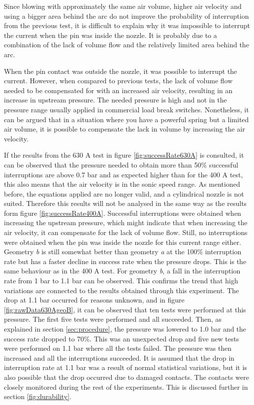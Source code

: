 \documentclass[10pt,a4paper,twoside]{article}
\begin{document}
Since blowing with approximately the same air volume, higher air velocity and using a bigger area behind the arc do not improve the probability of interruption from the previous test, it is difficult to explain why it was impossible to interrupt the current when the pin was inside the nozzle. It is probably due to a combination of the lack of volume flow and the relatively limited area behind the arc. 

When the pin contact was outside the nozzle, it was possible to interrupt the current. However, when compared to previous tests, the lack of volume flow needed to be compensated for with an increased air velocity, resulting in an increase in upstream pressure. The needed pressure is high and not in the pressure range usually applied in commercial load break switches. Nonetheless, it can be argued that in a situation where you have a powerful spring but a limited air volume, it is possible to compensate the lack in volume by increasing the air velocity.

If the results from the 630 A test in figure \ref{fig:successRate630A} is consulted, it can be observed that the pressure needed to obtain more than 50\% successful interruptions are above 0.7 bar and as expected higher than for the 400 A test, this also means that the air velocity is in the sonic speed range. As mentioned before, the equations applied are no longer valid, and a cylindrical nozzle is not suited. Therefore this results will not be analysed in the same way as the results form figure \ref{fig:successRate400A}. Successful interruptions were obtained when increasing the upstream pressure, which might indicate that when increasing the air velocity, it can compensate for the lack of volume flow. Still, no interruptions were obtained when the pin was inside the nozzle for this current range either. Geometry \textit{b} is still somewhat better than geometry \textit{a} at the 100\% interruption rate but has a faster decline in success rate when the pressure drops. This is the same behaviour as in the 400 A test. For geometry \textit{b}, a fall in the interruption rate from 1 bar to 1.1 bar can be observed. This confirms the trend that high variations are connected to the results obtained through this experiment. The drop at 1.1 bar occurred for reasons unknown, and in figure \ref{fig:rawData630AgeoB}, it can be observed that ten tests were performed at this pressure. The first five tests were performed and all succeeded. Then, as explained in section \ref{sec:procedure}, the pressure was lowered to 1.0 bar and the success rate dropped to 70\%. This was an unexpected drop and five new tests were performed on 1.1 bar where all the tests failed. The pressure was then increased and all the interruptions succeeded. It is assumed that the drop in interruption rate at 1.1 bar was a result of normal statistical variations, but it is also possible that the drop occurred due to damaged contacts. The contacts were closely monitored during the rest of the experiments. This is discussed further in section \ref{fig:durability}.
\end{document}
